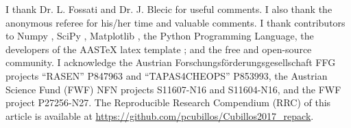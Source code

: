 \documentclass[tighten, times, twocolumn, trackchanges]{aastex61}
\begin{document}
\acknowledgments

I thank Dr. L. Fossati and Dr. J. Blecic for useful
comments.  I also thank the anonymous referee for his/her time
and valuable comments.  I thank contributors to
Numpy \citep{vanderWaltEtal2011numpy}, SciPy
\citep{JonesEtal2001scipy}, Matplotlib
\citep{Hunter2007ieeeMatplotlib}, the Python Programming Language,
the developers of the AASTeX latex
template \citep{AASteam2016aastex61}; and the free and open-source
community.  I acknowledge the Austrian
Forschungsf{\"o}rderungsgesellschaft FFG projects ``RASEN'' P847963
and ``TAPAS4CHEOPS'' P853993, the Austrian Science Fund (FWF) NFN
projects S11607-N16 and S11604-N16, and the FWF project
P27256-N27. The Reproducible Research Compendium (RRC) of this
article is available at
\href{https://github.com/pcubillos/Cubillos2017\_repack}
{https://github.com/pcubillos/Cubillos2017\_repack}.


%
\end{document}
